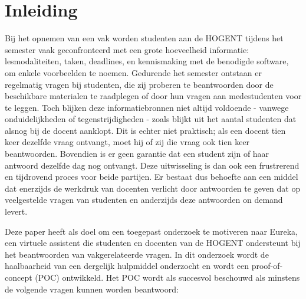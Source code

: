 


% 

\section{Inleiding}%
\label{sec:inleiding}

Bij het opnemen van een vak worden studenten aan de HOGENT tijdens het semester vaak geconfronteerd met een grote hoeveelheid informatie: lesmodaliteiten, taken, deadlines, en kennismaking met de benodigde software, om enkele voorbeelden te noemen. Gedurende het semester ontstaan er regelmatig vragen bij studenten, die zij proberen te beantwoorden door de beschikbare materialen te raadplegen of door hun vragen aan medestudenten voor te leggen. Toch blijken deze informatiebronnen niet altijd voldoende - vanwege onduidelijkheden of tegenstrijdigheden - zoals blijkt uit het aantal studenten dat alsnog bij de docent aanklopt. Dit is echter niet praktisch; als een docent tien keer dezelfde vraag ontvangt, moet hij of zij die vraag ook tien keer beantwoorden. Bovendien is er geen garantie dat een student zijn of haar antwoord dezelfde dag nog ontvangt. Deze uitwisseling is dan ook een frustrerend en tijdrovend proces voor beide partijen. Er bestaat dus behoefte aan een middel dat enerzijds de werkdruk van docenten verlicht door antwoorden te geven dat op veelgestelde vragen van studenten en anderzijds deze antwoorden on demand levert. 

Deze paper heeft als doel om een toegepast onderzoek te motiveren naar Eureka, een virtuele assistent die studenten en docenten van de HOGENT ondersteunt bij het beantwoorden van vakgerelateerde vragen. In dit onderzoek wordt de haalbaarheid van een dergelijk hulpmiddel onderzocht en wordt een proof-of-concept (POC) ontwikkeld. Het POC wordt als succesvol beschouwd als minstens de volgende vragen kunnen worden beantwoord: 

